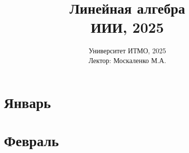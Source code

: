 \documentclass{article}
\author{}
\title{Линейная алгебра\\ИИИ, 2025}
\date{Университет ИТМО, 2025 \\ Лектор: Москаленко М.А.}
\begin{document}
\maketitle

\tableofcontents

\newpage

\section{Январь}


\section{Февраль}

\end{document}
